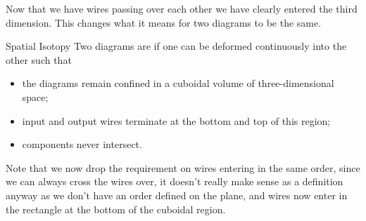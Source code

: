 \documentclass[fleqn]{NotesClass}
\begin{document}
    Now that we have wires passing over each other we have clearly entered the third dimension.
    This changes what it means for two diagrams to be the same.
    \begin{dfn}{Spatial Isotopy}{}
        Two diagrams are  if one can be deformed continuously into the other such that
        \begin{itemize}
            \item the diagrams remain confined in a cuboidal volume of three-dimensional space;
            \item input and output wires terminate at the bottom and top of this region;
            \item components never intersect.
        \end{itemize}
    \end{dfn}
    Note that we now drop the requirement on wires entering in the same order, since we can always cross the wires over, it doesn't really make sense as a definition anyway as we don't have an order defined on the plane, and wires now enter in the rectangle at the bottom of the cuboidal region.
    
\end{document}
